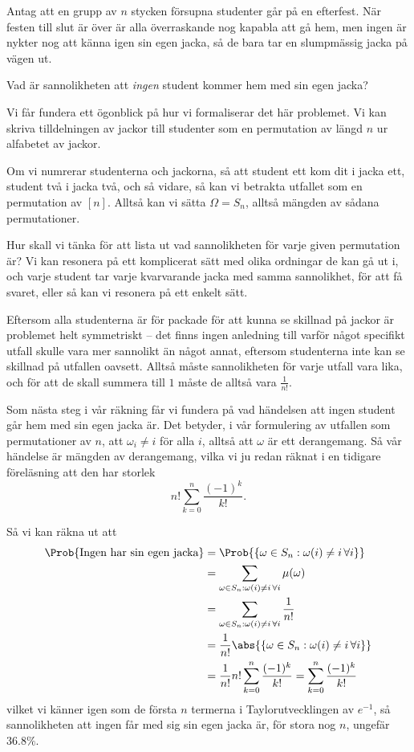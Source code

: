 \documentclass[nobib]{tufte-handout}
\begin{document}
\begin{example}
    Antag att en grupp av $n$ stycken försupna studenter går på en efterfest. När festen till slut är över är alla överraskande nog kapabla att gå hem, men ingen är nykter nog att känna igen sin egen jacka, så de bara tar en slumpmässig jacka på vägen ut.

    Vad är sannolikheten att \emph{ingen} student kommer hem med sin egen jacka?

    Vi får fundera ett ögonblick på hur vi formaliserar det här problemet. Vi kan skriva tilldelningen av jackor till studenter som en permutation av längd $n$ ur alfabetet av jackor. 
    
    Om vi numrerar studenterna och jackorna, så att student ett kom dit i jacka ett, student två i jacka två, och så vidare, så kan vi betrakta utfallet som en permutation av $[n]$. Alltså kan vi sätta $\Omega = S_n$, alltså mängden av sådana permutationer.

    Hur skall vi tänka för att lista ut vad sannolikheten för varje given permutation är? Vi kan resonera på ett komplicerat sätt med olika ordningar de kan gå ut i, och varje student tar varje kvarvarande jacka med samma sannolikhet, för att få svaret, eller så kan vi resonera på ett enkelt sätt.

    Eftersom alla studenterna är för packade för att kunna se skillnad på jackor är problemet helt symmetriskt -- det finns ingen anledning till varför något specifikt utfall skulle vara mer sannolikt än något annat, eftersom studenterna inte kan se skillnad på utfallen oavsett. Alltså måste sannolikheten för varje utfall vara lika, och för att de skall summera till $1$ måste de alltså vara $\frac{1}{n!}$.

    Som nästa steg i vår räkning får vi fundera på vad händelsen att ingen student går hem med sin egen jacka är. Det betyder, i vår formulering av utfallen som permutationer av $n$, att $\omega_i \neq i$ för alla $i$, alltså att $\omega$ är ett derangemang. Så vår händelse är mängden av derangemang, vilka vi ju redan räknat i en tidigare föreläsning att den har storlek
    $$n!\sum_{k=0}^{n} \frac{(-1)^k}{k!}.$$

    Så vi kan räkna ut att
    \begin{align*}
        \Prob{\text{Ingen har sin egen jacka}} &= \Prob{\left\{\omega \in S_n: \omega(i) \neq i\, \forall i\right\}}\\
        &= \sum_{\omega \in S_n: \omega(i) \neq i\, \forall i} \mu(\omega)\\
        &= \sum_{\omega \in S_n: \omega(i) \neq i\, \forall i} \frac{1}{n!}\\
        &= \frac{1}{n!}\abs{\left\{\omega \in S_n: \omega(i) \neq i\, \forall i\right\}}\\
        &= \frac{1}{n!}n!\sum_{k=0}^{n} \frac{(-1)^k}{k!} = \sum_{k=0}^{n} \frac{(-1)^k}{k!}
    \end{align*}
    vilket vi känner igen som de första $n$ termerna i Taylorutvecklingen av $e^{-1}$, så sannolikheten att ingen får med sig sin egen jacka är, för stora nog $n$, ungefär $36.8\%$.
\end{example}
\end{document}
